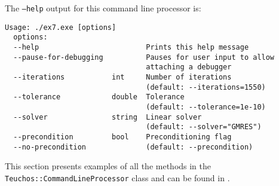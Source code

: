 The {\tt --help} output for this command line processor is:
{\small
\begin{verbatim}
Usage: ./ex7.exe [options]
  options:
  --help                         Prints this help message
  --pause-for-debugging          Pauses for user input to allow 
                                 attaching a debugger
  --iterations           int     Number of iterations
                                 (default: --iterations=1550)
  --tolerance            double  Tolerance
                                 (default: --tolerance=1e-10)
  --solver               string  Linear solver
                                 (default: --solver="GMRES")
  --precondition         bool    Preconditioning flag
  --no-precondition              (default: --precondition)
\end{verbatim}}
\noindent This section presents examples of all the methods in the 
{\tt Teuchos::CommandLineProcessor} class and can be found in
.  








